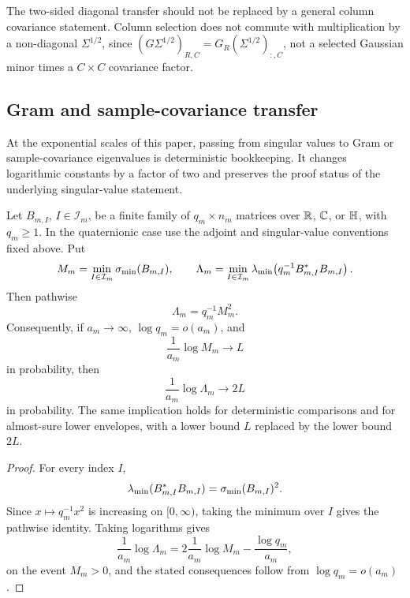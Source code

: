 \begin{remark}
The two-sided diagonal transfer should not be replaced by a general column
covariance statement.  Column selection does not commute with multiplication by
a non-diagonal \(\Sigma^{1/2}\), since
\((G\Sigma^{1/2})_{R,C}=G_R(\Sigma^{1/2})_{:,C}\), not a selected Gaussian minor
times a \(C\times C\) covariance factor.
\end{remark}

\subsection{Gram and sample-covariance transfer}

At the exponential scales of this paper, passing from singular values to Gram
or sample-covariance eigenvalues is deterministic bookkeeping.  It changes
logarithmic constants by a factor of two and preserves the proof status of the
underlying singular-value statement.

\begin{corollary}\label{cor:gram-transfer}
Let \(B_{m,I}\), \(I\in\mathcal I_m\), be a finite family of \(q_m\times n_m\)
matrices over \(\mathbb{R}\), \(\mathbb{C}\), or \(\mathbb{H}\), with \(q_m\ge1\).  In the quaternionic
case use the adjoint and singular-value conventions fixed above.  Put
\[
  M_m=\min_{I\in\mathcal I_m}\sigma_{\min}(B_{m,I}),\qquad
  \Lambda_m=\min_{I\in\mathcal I_m}
  \lambda_{\min}\!\left(q_m^{-1}B_{m,I}^*B_{m,I}\right).
\]
Then pathwise
\[
  \Lambda_m=q_m^{-1}M_m^2.
\]
Consequently, if \(a_m\to\infty\), \(\log q_m=o(a_m)\), and
\[
  \frac1{a_m}\log M_m\to L
\]
in probability, then
\[
  \frac1{a_m}\log\Lambda_m\to 2L
\]
in probability.  The same implication holds for deterministic comparisons and
for almost-sure lower envelopes, with a lower bound \(L\) replaced by the lower
bound \(2L\).
\end{corollary}

\begin{proof}
For every index \(I\),
\[
  \lambda_{\min}(B_{m,I}^*B_{m,I})=\sigma_{\min}(B_{m,I})^2.
\]
Since \(x\mapsto q_m^{-1}x^2\) is increasing on \([0,\infty)\), taking the
minimum over \(I\) gives the pathwise identity.  Taking logarithms gives
\[
  \frac1{a_m}\log\Lambda_m
  =
  2\frac1{a_m}\log M_m-\frac{\log q_m}{a_m},
\]
on the event \(M_m>0\), and the stated consequences follow from
\(\log q_m=o(a_m)\).
\end{proof}

